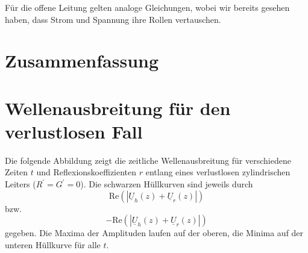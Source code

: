 \documentclass[paper=a4, parskip=half-, ngerman, fontsize=11pt]{scrreprt}
\begin{document}
Für die offene Leitung gelten analoge Gleichungen, wobei wir bereits gesehen haben, dass Strom und Spannung ihre Rollen
vertauschen.


\chapter{Zusammenfassung}



\appendix

\chapter{Wellenausbreitung für den verlustlosen Fall}
Die folgende Abbildung zeigt die zeitliche Wellenausbreitung für verschiedene Zeiten $t$ und Reflexionskoeffizienten
$r$ entlang eines verlustlosen zylindrischen Leiters ($R^{\prime} = G^{\prime} = 0$). Die schwarzen Hüllkurven sind
jeweils durch \[
\mathrm{Re} ( \left| \underline{U}_{h}(z) + \underline{U}_{r}(z) \right| )
\] bzw. \[
- \mathrm{Re} ( \left| \underline{U}_{h}(z) + \underline{U}_{r}(z) \right| )
\] gegeben. Die Maxima der Amplituden laufen auf der oberen, die Minima auf der unteren Hüllkurve für alle $t$.
\end{document}
